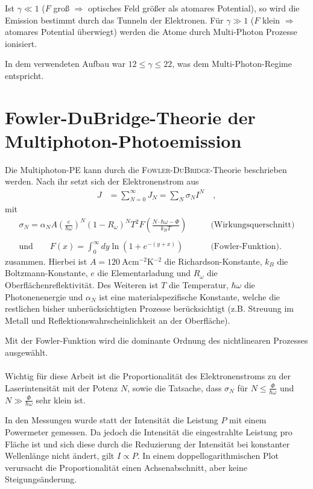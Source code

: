 \documentclass[bachelor,       %
               twoside,        %
               BCOR10mm,       %
               english,ngerman, %
               ]{GAUBM}
\begin{document}
Ist $\gamma\ll 1$ ($F$ groß $\Rightarrow$ optisches Feld gr\"o{\ss}er als atomares Potential), so wird die Emission bestimmt durch das Tunneln der Elektronen.
Für $\gamma\gg 1$ ($F$ klein $\Rightarrow$ atomares Potential \"uberwiegt) werden die Atome durch Multi-Photon Prozesse ionisiert.\newline

In dem verwendeten Aufbau war $12\leq\gamma\leq22$, was dem Multi-Photon-Regime entspricht.

\section{Fowler-DuBridge-Theorie der Multiphoton-Photoemission}
Die Multiphoton-PE kann durch die \textsc{Fowler-DuBridge}-Theorie beschrieben werden\cite{bechtel_1977}\cite{girardeau_1995}.
Nach ihr setzt sich der Elektronenstrom aus
\begin{align}
	J&=\sum_{N=0}^\infty J_N=\sum_N\sigma_NI^N \quad ,\label{eq:photostrom}
\end{align}
mit
\begin{align*}
\sigma_N=\alpha_NA\left(\frac{e}{\hbar\omega}\right)^N(1-R_\omega)^NT^2F\left(\frac{N\cdot \hbar\omega-\Phi}{k_BT}\right)\qquad&\text{(Wirkungsquerschnitt)}\\\\
\text{und}\qquad F(x)=\int_0^\infty dy\ln \left(1+e^{-(y+x)}\right)\qquad &\text{(Fowler-Funktion).}
\end{align*}
zusammen.
Hierbei ist $A=\SI{120}{\A\cm^{-2}\K^{-2}}$ die Richardson-Konstante, $k_B$ die Boltzmann-Konstante, $e$ die Elementarladung und $R_\omega$ die Oberflächenreflektivität.
Des Weiteren ist $T$ die Temperatur, $\hbar\omega$ die Photonenenergie und $\alpha_N$ ist eine materialspezifische Konstante, welche die restlichen bisher unberücksichtigten Prozesse berücksichtigt (z.B. Streuung im Metall und Reflektionswahrscheinlichkeit an der Oberfläche)\cite{brogle}.

Mit der Fowler-Funktion wird die dominante Ordnung des nichtlinearen Prozesses ausgewählt.\\\\

Wichtig für diese Arbeit ist die Proportionalität des Elektronenstroms zu der Laserintensität mit der Potenz $N$, sowie die Tatsache, dass $\sigma_N$ f\"ur $N\leq\frac{\Phi}{\hbar\omega}$ und $N\gg\frac{\Phi}{\hbar\omega}$ sehr klein ist.



In den Messungen wurde statt der Intensität die Leistung $P$ mit einem Powermeter gemessen.
Da jedoch die Intensität die eingestrahlte Leistung pro Fläche ist und sich diese durch die Reduzierung der Intensität bei konstanter Wellenlänge nicht ändert, gilt $I\propto P$.
In einem doppellogarithmischen Plot verursacht die Proportionalität einen Achsenabschnitt, aber keine Steigungsänderung.
\end{document}

